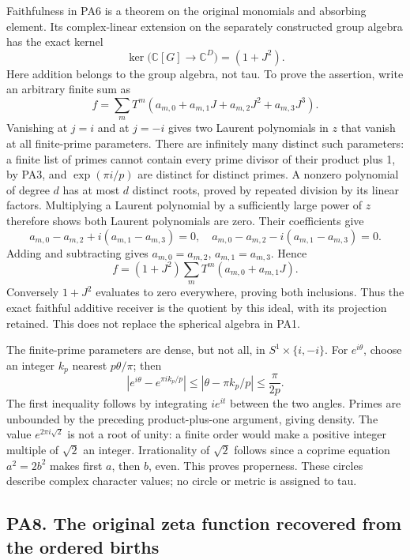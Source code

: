 Faithfulness in PA6 is a theorem on the original monomials and absorbing element. Its complex-linear extension on the separately constructed group algebra has the exact kernel \[
\ker\bigl(\mathbb C[G]\to\mathbb C^D\bigr)=(1+J^2).
\tag{PA7.1}
\] Here addition belongs to the group algebra, not tau. To prove the assertion, write an arbitrary finite sum as \[
f=\sum_mT^m(a_{m,0}+a_{m,1}J+a_{m,2}J^2+a_{m,3}J^3).
\] Vanishing at \(j=i\) and at \(j=-i\) gives two Laurent polynomials in \(z\) that vanish at all finite-prime parameters. There are infinitely many distinct such parameters: a finite list of primes cannot contain every prime divisor of their product plus 1, by PA3, and \(\exp(\pi i/p)\) are distinct for distinct primes. A nonzero polynomial of degree \(d\) has at most \(d\) distinct roots, proved by repeated division by its linear factors. Multiplying a Laurent polynomial by a sufficiently large power of \(z\) therefore shows both Laurent polynomials are zero. Their coefficients give \[
a_{m,0}-a_{m,2}+i(a_{m,1}-a_{m,3})=0,
\quad
a_{m,0}-a_{m,2}-i(a_{m,1}-a_{m,3})=0.
\] Adding and subtracting gives \(a_{m,0}=a_{m,2}\), \(a_{m,1}=a_{m,3}\). Hence \[
f=(1+J^2)\sum_mT^m(a_{m,0}+a_{m,1}J).
\] Conversely \(1+J^2\) evaluates to zero everywhere, proving both inclusions. Thus the exact faithful additive receiver is the quotient by this ideal, with its projection retained. This does not replace the spherical algebra in PA1.

The finite-prime parameters are dense, but not all, in \(S^1\times\{i,-i\}\). For \(e^{i\theta}\), choose an integer \(k_p\) nearest \(p\theta/\pi\); then \[
|e^{i\theta}-e^{\pi i k_p/p}|\le |\theta-\pi k_p/p|\le\frac{\pi}{2p}.
\] The first inequality follows by integrating \(i e^{it}\) between the two angles. Primes are unbounded by the preceding product-plus-one argument, giving density. The value \(e^{2\pi i\sqrt2}\) is not a root of unity: a finite order would make a positive integer multiple of \(\sqrt2\) an integer. Irrationality of \(\sqrt2\) follows since a coprime equation \(a^2=2b^2\) makes first \(a\), then \(b\), even. This proves properness. These circles describe complex character values; no circle or metric is assigned to tau.

\subsection{PA8. The original zeta function recovered from the ordered births}\label{pa20260924-pa8.-the-original-zeta-function-recovered-from-the-ordered-births}


